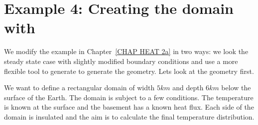 \section{Example 4: Creating the domain with \pycad}
\label{example4}

We modify the example in Chapter~\ref{CHAP HEAT 2a} in two ways: we look the steady state 
case with slightly modified boundary conditions and use a more flexible tool 
to generate to generate the geometry. Lets look at the geometry first. 

We want to define a rectangular domain of width $5 km$ and depth $6 km$ below the surface of the Earth. The domain is subject to a few conditions. The temperature is known at the surface and the basement has a known heat flux. Each side of the domain is insulated and the aim is to calculate the final temperature distribution.

